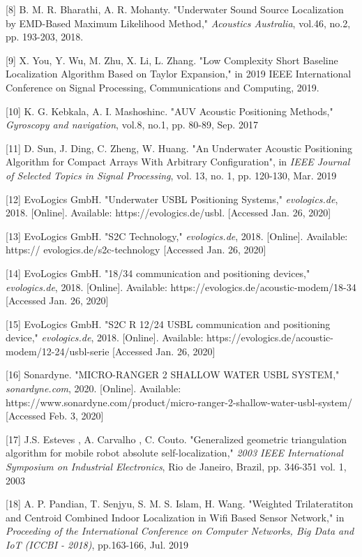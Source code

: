 [8] B. M. R. Bharathi, A. R. Mohanty. "Underwater Sound Source Localization by EMD-Based Maximum Likelihood Method," \textit{Acoustics Australia}, vol.46, no.2, pp. 193-203, 2018.
\label{r:crosscorr}

[9] X. You, Y. Wu, M. Zhu, X. Li, L. Zhang. "Low Complexity Short Baseline Localization Algorithm Based on Taylor Expansion," in 2019 IEEE International Conference on Signal Processing, Communications and Computing, 2019.
\label{r:sbl}

[10] K. G. Kebkala, A. I. Mashoshinc. "AUV Acoustic Positioning Methods," \textit{Gyroscopy and navigation}, vol.8, no.1, pp. 80-89, Sep. 2017
\label{r:lblsblusbl}

[11] D. Sun, J. Ding, C. Zheng, W. Huang. "An Underwater Acoustic Positioning Algorithm for Compact Arrays With Arbitrary Configuration", in \textit{IEEE Journal of Selected Topics in Signal Processing}, vol. 13, no. 1, pp. 120-130, Mar. 2019
\label{r:usbl-new}

[12] EvoLogics GmbH. "Underwater USBL Positioning Systems," \textit{evologics.de}, 2018. [Online]. Available: https://evologics.de/usbl. [Accessed Jan. 26, 2020]
\label{r:evologics1}

[13] EvoLogics GmbH. "S2C Technology," \textit{evologics.de}, 2018. [Online]. Available: https://
evologics.de/s2c-technology [Accessed Jan. 26, 2020]
\label{r:evologics2}

[14] EvoLogics GmbH. "18/34 communication and positioning devices," \textit{evologics.de}, 2018. [Online]. Available: https://evologics.de/acoustic-modem/18-34 [Accessed Jan. 26, 2020]
\label{r:evologics3}

[15] EvoLogics GmbH. "S2C R 12/24 USBL communication and positioning device," \textit{evologics.de}, 2018. [Online]. Available: https://evologics.de/acoustic-modem/12-24/usbl-serie [Accessed Jan. 26, 2020]
\label{r:evologics4}

[16] Sonardyne. "MICRO-RANGER 2 SHALLOW WATER USBL SYSTEM," \textit{sonardyne.com}, 2020. [Online]. Available: https://www.sonardyne.com/product/micro-ranger-2-shallow-water-usbl-system/ [Accessed Feb. 3, 2020]
\label{r:sonardyne1}

[17] J.S. Esteves , A. Carvalho , C. Couto. "Generalized geometric triangulation algorithm for mobile robot absolute self-localization,"\textit{ 2003 IEEE International Symposium on Industrial Electronics}, Rio de Janeiro, Brazil, pp. 346-351 vol. 1, 2003
\label{r:r17}

[18] A. P. Pandian, T. Senjyu, S. M. S. Islam, H. Wang. "Weighted Trilateratiton and Centroid Combined Indoor Localization in Wifi Based Sensor Network," in \textit{Proceeding of the International Conference on Computer Networks, Big Data and IoT (ICCBI - 2018)}, pp.163-166, Jul. 2019
\label{r:r18}

